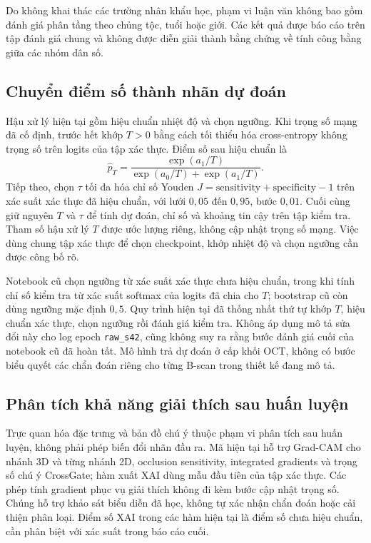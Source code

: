 \documentclass[14pt,a4paper,oneside]{extreport}
\begin{document}
Do không khai thác các trường nhân khẩu học, phạm vi luận văn không
bao gồm đánh giá phân tầng theo chủng tộc, tuổi hoặc giới. Các kết quả
được báo cáo trên tập đánh giá chung và không được diễn giải thành
bằng chứng về tính công bằng giữa các nhóm dân số.

\subsection{Chuyển điểm số thành nhãn dự đoán}
Hậu xử lý hiện tại gồm hiệu chuẩn nhiệt độ và chọn ngưỡng. Khi trọng
số mạng đã cố định, trước hết khớp $T>0$ bằng cách tối thiểu hóa
cross-entropy không trọng số trên logits của tập xác thực. Điểm số
sau hiệu chuẩn là
\begin{equation}
 \widehat p_T=\frac{\exp(a_1/T)}{\exp(a_0/T)+\exp(a_1/T)}.
\end{equation}
Tiếp theo, chọn $\tau$ tối đa hóa chỉ số Youden
$J=\mathrm{sensitivity}+\mathrm{specificity}-1$ trên xác suất xác thực
đã hiệu chuẩn, với lưới $0{,}05$ đến $0{,}95$, bước $0{,}01$.
Cuối cùng giữ nguyên $T$ và $\tau$ để tính dự đoán, chỉ số và khoảng
tin cậy trên tập kiểm tra. Tham số hậu xử lý $T$ được ước lượng riêng,
không cập nhật trọng số mạng. Việc dùng chung tập xác thực để chọn
checkpoint, khớp nhiệt độ và chọn ngưỡng cần được công bố rõ.

Notebook cũ chọn ngưỡng từ xác suất xác thực chưa hiệu chuẩn, trong
khi tính chỉ số kiểm tra từ xác suất softmax của logits đã chia cho $T$; bootstrap cũ
còn dùng ngưỡng mặc định $0{,}5$. Quy trình hiện tại đã thống nhất
thứ tự khớp $T$, hiệu chuẩn xác thực, chọn ngưỡng rồi đánh giá kiểm tra.
Không áp dụng mô tả sửa đổi này cho log epoch \texttt{raw\_s42}, cũng
không suy ra rằng bước đánh giá cuối của notebook cũ đã hoàn tất.
Mô hình trả dự đoán ở cấp khối OCT, không có bước biểu quyết các
chẩn đoán riêng cho từng B-scan trong thiết kế đang mô tả.

\subsection{Phân tích khả năng giải thích sau huấn luyện}
Trực quan hóa đặc trưng và bản đồ chú ý thuộc phạm vi phân tích sau
huấn luyện, không phải phép biến đổi nhãn đầu ra. Mã hiện tại hỗ trợ
Grad-CAM cho nhánh 3D và từng nhánh 2D, occlusion sensitivity,
integrated gradients và trọng số chú ý CrossGate; hàm xuất XAI dùng
mẫu đầu tiên của tập xác thực. Các phép tính gradient phục vụ giải
thích không đi kèm bước cập nhật trọng số. Chúng hỗ trợ khảo sát biểu
diễn đã học, không tự xác nhận chẩn đoán hoặc cải thiện phân loại.
Điểm số XAI trong các hàm hiện tại là điểm số chưa hiệu chuẩn, cần
phân biệt với xác suất trong báo cáo cuối.
\end{document}
